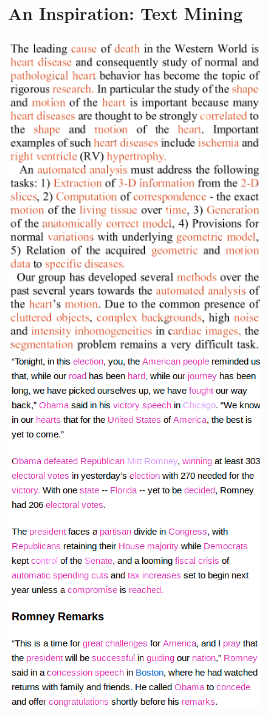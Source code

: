 \documentclass[10pt]{beamer}
\begin{document}
\begin{frame}
  \frametitle{An Inspiration: Text Mining}
  \begin{center}
    \includegraphics[width=0.5\textwidth,height=0.8\textheight]{FIGURES/ScreenshotMETAXAS}
      ~~
    \includegraphics[width=0.5\textwidth,height=0.8\textheight]{FIGURES/ScreenshotBloomberg}
  \end{center}
\end{frame}
\end{document}
